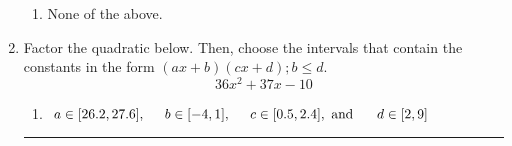 \documentclass[14pt]{extbook}
\newcommand{\litem}[1]{\item#1\hspace*{-1cm}\rule{\textwidth}{0.4pt}}
\begin{document}
\begin{enumerate}
{\begin{enumerate}[label=\Alph*.]
\item None of the above.
\end{enumerate} }
\litem{
Factor the quadratic below. Then, choose the intervals that contain the constants in the form $(ax+b)(cx+d); b \leq d.$\[ 36x^{2} +37 x -10 \]\begin{enumerate}[label=\Alph*.]
\item \( a \in [26.2, 27.6], \hspace*{5mm} b \in [-4, 1], \hspace*{5mm} c \in [0.5, 2.4], \text{ and } \hspace*{5mm} d \in [2, 9] \)

\end{enumerate}}
\end{enumerate}
\end{document}
